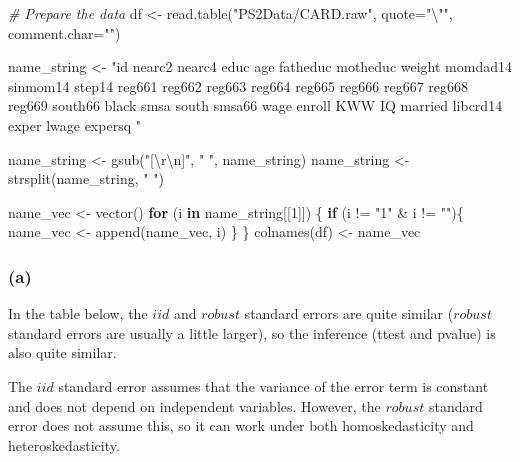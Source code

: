 \documentclass[
]{article}
\newenvironment{Shaded}{\begin{snugshade}}{\end{snugshade}}
\newcommand{\AttributeTok}[1]{\textcolor[rgb]{0.77,0.63,0.00}{#1}}
\newcommand{\CommentTok}[1]{\textcolor[rgb]{0.56,0.35,0.01}{\textit{#1}}}
\newcommand{\ControlFlowTok}[1]{\textcolor[rgb]{0.13,0.29,0.53}{\textbf{#1}}}
\newcommand{\DecValTok}[1]{\textcolor[rgb]{0.00,0.00,0.81}{#1}}
\newcommand{\FunctionTok}[1]{\textcolor[rgb]{0.00,0.00,0.00}{#1}}
\newcommand{\NormalTok}[1]{#1}
\newcommand{\OtherTok}[1]{\textcolor[rgb]{0.56,0.35,0.01}{#1}}
\newcommand{\SpecialCharTok}[1]{\textcolor[rgb]{0.00,0.00,0.00}{#1}}
\newcommand{\StringTok}[1]{\textcolor[rgb]{0.31,0.60,0.02}{#1}}
\begin{document}
\begin{Shaded}
\begin{Highlighting}[]
\CommentTok{\# Prepare the data}
\NormalTok{df }\OtherTok{\textless{}{-}} \FunctionTok{read.table}\NormalTok{(}\StringTok{"PS2Data/CARD.raw"}\NormalTok{, }\AttributeTok{quote=}\StringTok{"}\SpecialCharTok{\textbackslash{}"}\StringTok{"}\NormalTok{, }\AttributeTok{comment.char=}\StringTok{""}\NormalTok{)}

\NormalTok{name\_string }\OtherTok{\textless{}{-}} \StringTok{"id   nearc2    nearc4    educ      age       fatheduc  motheduc  }
\StringTok{weight   momdad14  sinmom14  step14    reg661    reg662    reg663    reg664   }
\StringTok{reg665 reg666    reg667    reg668    reg669    south66   black     smsa   south    }
\StringTok{smsa66    wage      enroll    KWW       IQ        married   libcrd14  exper    }
\StringTok{lwage     expersq   "}

\NormalTok{name\_string }\OtherTok{\textless{}{-}} \FunctionTok{gsub}\NormalTok{(}\StringTok{"[}\SpecialCharTok{\textbackslash{}r\textbackslash{}n}\StringTok{]"}\NormalTok{, }\StringTok{" "}\NormalTok{, name\_string)}
\NormalTok{name\_string }\OtherTok{\textless{}{-}} \FunctionTok{strsplit}\NormalTok{(name\_string, }\StringTok{" "}\NormalTok{)}

\NormalTok{name\_vec }\OtherTok{\textless{}{-}} \FunctionTok{vector}\NormalTok{()}
\ControlFlowTok{for}\NormalTok{ (i }\ControlFlowTok{in}\NormalTok{ name\_string[[}\DecValTok{1}\NormalTok{]]) \{}
  \ControlFlowTok{if}\NormalTok{ (i }\SpecialCharTok{!=} \StringTok{"1"} \SpecialCharTok{\&}\NormalTok{ i }\SpecialCharTok{!=} \StringTok{""}\NormalTok{)\{}
\NormalTok{    name\_vec }\OtherTok{\textless{}{-}} \FunctionTok{append}\NormalTok{(name\_vec, i)}
\NormalTok{  \}}
\NormalTok{\}}
\FunctionTok{colnames}\NormalTok{(df) }\OtherTok{\textless{}{-}}\NormalTok{ name\_vec}
\end{Highlighting}
\end{Shaded}

\hypertarget{a-1}{%
\subsubsection{(a)}\label{a-1}}

In the table below, the \(iid\) and \(robust\) standard errors are quite
similar (\(robust\) standard errors are usually a little larger), so the
inference (ttest and pvalue) is also quite similar.

The \(iid\) standard error assumes that the variance of the error term
is constant and does not depend on independent variables. However, the
\(robust\) standard error does not assume this, so it can work under
both homoskedasticity and heteroskedasticity.
\end{document}
